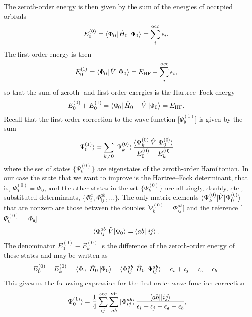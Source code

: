 \documentclass[../Main/chem532-notes.tex]{subfiles}
\begin{document}
The zeroth-order energy is then given by the sum of the energies of occupied orbitals
\begin{equation}
E^{(0)}_0 = \bra{\Phi_0} \hat{H}_0 \ket{\Phi_0} = \sum_i^{\mathrm{occ}} \epsilon_i.
\end{equation}
The first-order energy is then
\begin{equation}
E^{(1)}_0 = \bra{\Phi_0} \hat{V} \ket{\Phi_0} = E_\mathrm{HF} - \sum_i^{\mathrm{occ}} \epsilon_i,
\end{equation}
so that the sum of zeroth- and first-order energies is the Hartree--Fock energy
\begin{equation}
E^{(0)}_0 + E^{(1)}_0 = \bra{\Phi_0} \hat{H}_0 + \hat{V} \ket{\Phi_0} = E_\mathrm{HF}.
\end{equation}
Recall that the first-order correction to the wave function [$\Psi_0^{(1)}$] is given by the sum
\begin{equation}
\ket{\Psi_0^{(1)}} = \sum_{k \neq 0} \ket{\Psi_k^{(0)}} \frac{\braket{\Psi_k^{(0)}|\hat{V}|\Psi_0^{(0)}}}{E_0^{(0)} - E_k^{(0)}}
\end{equation}
where the set of states $\{\Psi_k^{(0)}\}$ are eigenstates of the zeroth-order Hamiltonian.
In our case the state that we want to improve is the Hartree--Fock determinant, that is, $\Psi_0^{(0)} = \Phi_0$, and the other states in the set $\{\Psi_k^{(0)}\}$ are all singly, doubly, etc., substituted determinants, $\{\Phi_{i}^{a}, \Phi_{ij}^{ab}, \ldots \}$.
The only matrix elements $\braket{\Psi_k^{(0)}|\hat{V}|\Psi_0^{(0)}}$ that are nonzero are those between the doubles [$\Psi_k^{(0)} = \Phi_{ij}^{ab}$] and the reference [$\Psi_0^{(0)} = \Phi_0$]
\begin{equation}
\braket{\Phi_{ij}^{ab}|\hat{V}|\Phi_0} = \bra{ab}\!\ket{ij}.
\end{equation}
The denominator $E_0^{(0)} - E_k^{(0)}$ is the difference of the zeroth-order energy of these states and may be written as
\begin{equation}
E_0^{(0)} - E_k^{(0)} = \bra{\Phi_0} \hat{H}_0 \ket{\Phi_0} - 
\bra{\Phi_{ij}^{ab}} \hat{H}_0 \ket{\Phi_{ij}^{ab}} = 
\epsilon_i + \epsilon_j - \epsilon_a - \epsilon_b.
\end{equation}
This gives us the following expression for the first-order wave function correction
\begin{equation}
\ket{\Psi_0^{(1)}} = \frac{1}{4} \sum_{ij}^{\mathrm{occ}} \sum_{ab}^{\mathrm{vir}}  \ket{\Phi_{ij}^{ab}} \frac{\bra{ab}\!\ket{ij}}{\epsilon_i + \epsilon_j - \epsilon_a - \epsilon_b},
\end{equation}
\end{document}
